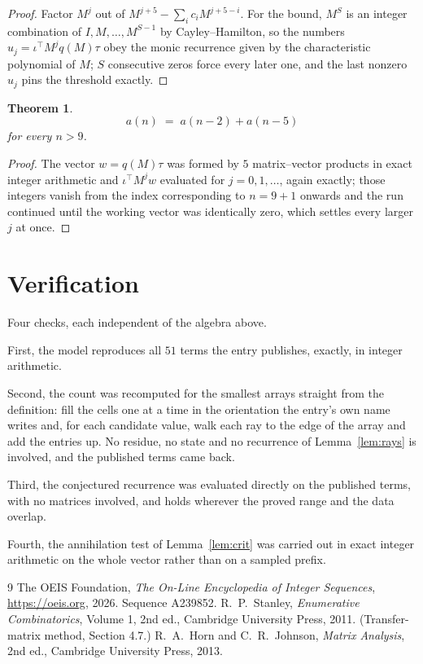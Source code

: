 \documentclass[11pt,a4paper]{article}
\theoremstyle{plain}
\newtheorem{theorem}{Theorem}
\theoremstyle{definition}
\begin{document}
\begin{proof}
Factor $M^{j}$ out of $M^{j+5}-\sum_ic_iM^{j+5-i}$. For the bound, $M^{S}$
is an integer combination of $I,M,\dots,M^{S-1}$ by Cayley--Hamilton, so the numbers
$u_j=\iota^{\!\top}M^{j}q(M)\tau$ obey the monic recurrence given by the characteristic
polynomial of $M$; $S$ consecutive zeros force every later one, and the last nonzero $u_j$
pins the threshold exactly.
\end{proof}

\begin{theorem}
\[
a(n)\;=\;a(n-2) + a(n-5)
\]
for every $n>9$.
\end{theorem}

\begin{proof}
The vector $w=q(M)\tau$ was formed by $5$ matrix--vector products in exact integer
arithmetic and $\iota^{\!\top}M^{j}w$ evaluated for $j=0,1,\dots$, again exactly; those
integers vanish from the index corresponding to $n=9+1$ onwards and the run continued
until the working vector was identically zero, which settles every larger $j$ at once.
\end{proof}

\section{Verification}

Four checks, each independent of the algebra above.

First, the model reproduces all $51$ terms the entry publishes, exactly, in integer
arithmetic.

Second, the count was recomputed for the smallest arrays straight from the definition: fill the
cells one at a time in the orientation the entry's own name writes and, for each candidate
value, walk each ray to the edge of the array and add the entries up. No residue, no state and
no recurrence of Lemma~\ref{lem:rays} is involved, and the published terms came back.

Third, the conjectured recurrence was evaluated directly on the published terms, with no
matrices involved, and holds wherever the proved range and the data overlap.

Fourth, the annihilation test of Lemma~\ref{lem:crit} was carried out in exact integer
arithmetic on the whole vector rather than on a sampled prefix.

\begin{thebibliography}{9}
 The OEIS Foundation, \emph{The On-Line Encyclopedia of Integer
Sequences}, \url{https://oeis.org}, 2026. Sequence A239852.
 R.~P.~Stanley, \emph{Enumerative Combinatorics}, Volume 1, 2nd ed.,
Cambridge University Press, 2011. (Transfer-matrix method, Section 4.7.)
 R.~A.~Horn and C.~R.~Johnson, \emph{Matrix Analysis}, 2nd ed., Cambridge
University Press, 2013.
\end{thebibliography}
\end{document}
